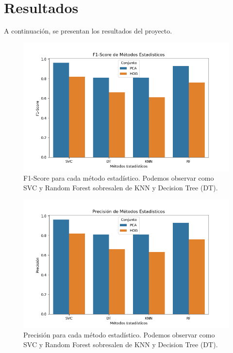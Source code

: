 \documentclass[twocolumn]{article}
\begin{document}
\section{Resultados}
A continuación, se presentan los resultados del proyecto.
\begin{figure}[H] 
  \centering
  \includegraphics[width=0.97\columnwidth]{F1Colectiva.png} 
  \caption{F1-Score para cada método estadístico. Podemos observar como SVC y Random Forest sobresalen de KNN y Decision Tree (DT). }
  \label{fig:f1score} 
\end{figure}
\vspace{-25pt}
\begin{figure}[H] 
  \centering
  \includegraphics[width=0.97\columnwidth]{PrecisionColectiva.png} 
  \caption{Precisión para cada método estadístico. Podemos observar como SVC y Random Forest sobresalen de KNN y Decision Tree (DT). }
  \label{fig:precision} 
\end{figure}
\vspace{-25pt}
\end{document}
